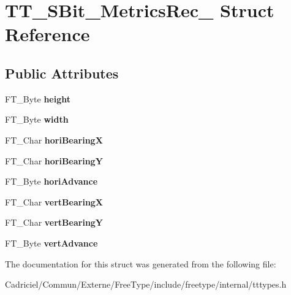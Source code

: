 \hypertarget{struct_t_t___s_bit___metrics_rec__}{}\section{T\+T\+\_\+\+S\+Bit\+\_\+\+Metrics\+Rec\+\_\+ Struct Reference}
\label{struct_t_t___s_bit___metrics_rec__}
\subsection*{Public Attributes}
\begin{DoxyCompactItemize}
\item 
F\+T\+\_\+\+Byte {\bfseries height}\hypertarget{struct_t_t___s_bit___metrics_rec___a79b25794122888101aae80c7b74fc1fc}{}\label{struct_t_t___s_bit___metrics_rec___a79b25794122888101aae80c7b74fc1fc}

\item 
F\+T\+\_\+\+Byte {\bfseries width}\hypertarget{struct_t_t___s_bit___metrics_rec___a3444618e2c2a612a662a5e0d2c3f25ef}{}\label{struct_t_t___s_bit___metrics_rec___a3444618e2c2a612a662a5e0d2c3f25ef}

\item 
F\+T\+\_\+\+Char {\bfseries hori\+BearingX}\hypertarget{struct_t_t___s_bit___metrics_rec___a786ba1081993e18d514ddf37c2662c7b}{}\label{struct_t_t___s_bit___metrics_rec___a786ba1081993e18d514ddf37c2662c7b}

\item 
F\+T\+\_\+\+Char {\bfseries hori\+BearingY}\hypertarget{struct_t_t___s_bit___metrics_rec___aaed1567b444a1bee4b3478b2cdb9259f}{}\label{struct_t_t___s_bit___metrics_rec___aaed1567b444a1bee4b3478b2cdb9259f}

\item 
F\+T\+\_\+\+Byte {\bfseries hori\+Advance}\hypertarget{struct_t_t___s_bit___metrics_rec___a8b0c5271aaf220f7a8cbf4838854e220}{}\label{struct_t_t___s_bit___metrics_rec___a8b0c5271aaf220f7a8cbf4838854e220}

\item 
F\+T\+\_\+\+Char {\bfseries vert\+BearingX}\hypertarget{struct_t_t___s_bit___metrics_rec___a626e67e02494faab653a7543bb0b7c79}{}\label{struct_t_t___s_bit___metrics_rec___a626e67e02494faab653a7543bb0b7c79}

\item 
F\+T\+\_\+\+Char {\bfseries vert\+BearingY}\hypertarget{struct_t_t___s_bit___metrics_rec___aef4755ed22ba72e5fa304920bae03146}{}\label{struct_t_t___s_bit___metrics_rec___aef4755ed22ba72e5fa304920bae03146}

\item 
F\+T\+\_\+\+Byte {\bfseries vert\+Advance}\hypertarget{struct_t_t___s_bit___metrics_rec___a947468e42759089d0b5c5fa10a0defdf}{}\label{struct_t_t___s_bit___metrics_rec___a947468e42759089d0b5c5fa10a0defdf}

\end{DoxyCompactItemize}


The documentation for this struct was generated from the following file\+:\begin{DoxyCompactItemize}
\item 
Cadriciel/\+Commun/\+Externe/\+Free\+Type/include/freetype/internal/tttypes.\+h\end{DoxyCompactItemize}
